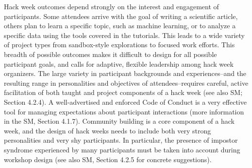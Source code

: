 
Hack week outcomes depend strongly on the interest and engagement of participants.
Some attendees arrive with the goal of writing a scientific article, others plan to learn a specific topic, such as machine learning, or to analyze a specific data using the tools covered in the tutorials.
This leads to a wide variety of project types from sandbox-style explorations to focused work efforts.
This breadth of possible outcomes makes it difficult to design for all possible participant goals, and calls for adaptive, flexible leadership among hack week organizers.
The large variety in participant backgrounds and experiences--and the resulting range in personalities and objectives of attendees--requires careful, active facilitation of both taught and project components of a hack week (see also SM; Section 4.2.4). A well-advertised and enforced Code of Conduct is a very effective tool for managing expectations about participant interactions (more information in the SM, Section 4.1.7).
Community building is a core component of a hack week, and the design of hack weeks needs to include both very strong personalities and very shy participants. In particular, the presence of impostor syndrome experienced by many participants must be taken into account during workshop design (see also SM, Section 4.2.5 for concrete suggestions).